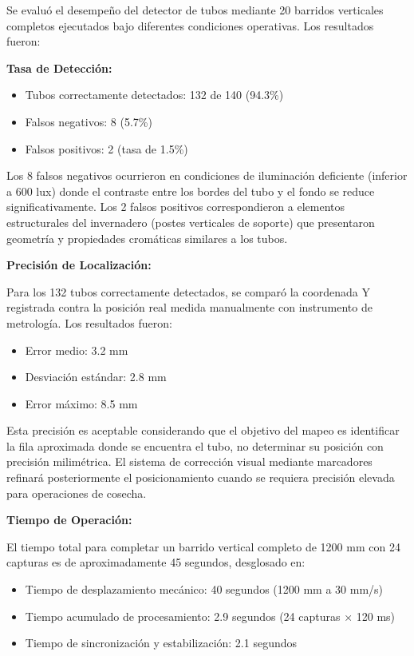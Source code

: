 Se evaluó el desempeño del detector de tubos mediante 20 barridos verticales completos ejecutados bajo diferentes condiciones operativas. Los resultados fueron:

\textbf{Tasa de Detección:}
\begin{itemize}
\item Tubos correctamente detectados: 132 de 140 (94.3\%)
\item Falsos negativos: 8 (5.7\%)
\item Falsos positivos: 2 (tasa de 1.5\%)
\end{itemize}

Los 8 falsos negativos ocurrieron en condiciones de iluminación deficiente (inferior a 600 lux) donde el contraste entre los bordes del tubo y el fondo se reduce significativamente. Los 2 falsos positivos correspondieron a elementos estructurales del invernadero (postes verticales de soporte) que presentaron geometría y propiedades cromáticas similares a los tubos.

\textbf{Precisión de Localización:}

Para los 132 tubos correctamente detectados, se comparó la coordenada Y registrada contra la posición real medida manualmente con instrumento de metrología. Los resultados fueron:

\begin{itemize}
\item Error medio: 3.2 mm
\item Desviación estándar: 2.8 mm
\item Error máximo: 8.5 mm
\end{itemize}

Esta precisión es aceptable considerando que el objetivo del mapeo es identificar la fila aproximada donde se encuentra el tubo, no determinar su posición con precisión milimétrica. El sistema de corrección visual mediante marcadores refinará posteriormente el posicionamiento cuando se requiera precisión elevada para operaciones de cosecha.

\textbf{Tiempo de Operación:}

El tiempo total para completar un barrido vertical completo de 1200 mm con 24 capturas es de aproximadamente 45 segundos, desglosado en:

\begin{itemize}
\item Tiempo de desplazamiento mecánico: 40 segundos (1200 mm a 30 mm/s)
\item Tiempo acumulado de procesamiento: 2.9 segundos (24 capturas × 120 ms)
\item Tiempo de sincronización y estabilización: 2.1 segundos
\end{itemize}

